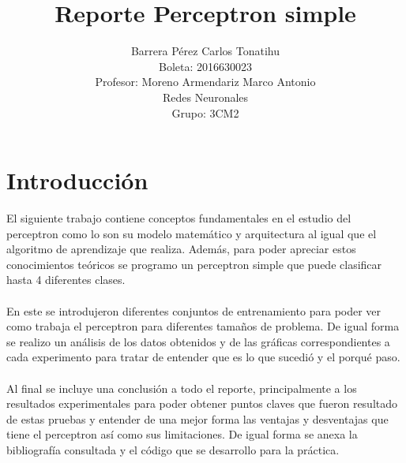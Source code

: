 \documentclass[12pt, titlepage]{article}
\title{Reporte Perceptron simple}
\author{Barrera Pérez Carlos Tonatihu \\Boleta: 2016630023\\ Profesor: Moreno Armendariz Marco Antonio \\ Redes Neuronales \\ Grupo: 3CM2 }
\begin{document}
    \maketitle
    \tableofcontents
    \newpage
    \section{Introducción}
    El siguiente trabajo contiene conceptos fundamentales en el estudio del perceptron como lo son su modelo matemático y arquitectura al igual que el algoritmo de aprendizaje que realiza. Además, para poder apreciar estos conocimientos teóricos se programo un perceptron simple que puede clasificar hasta 4 diferentes clases.
    \\\\
    En este se introdujeron diferentes conjuntos de entrenamiento para poder ver como trabaja el perceptron para diferentes tamaños de problema. De igual forma se realizo un análisis de los datos obtenidos y de las gráficas correspondientes a cada experimento para tratar de entender que es lo que sucedió y el porqué paso.
    \\\\
    Al final se incluye una conclusión a todo el reporte, principalmente a los resultados experimentales para poder obtener puntos claves que fueron resultado de estas pruebas y entender de una mejor forma las ventajas y desventajas que tiene el perceptron así como sus limitaciones. De igual forma se anexa la bibliografía consultada y el código que se desarrollo para la práctica.
    \newpage
\end{document}
